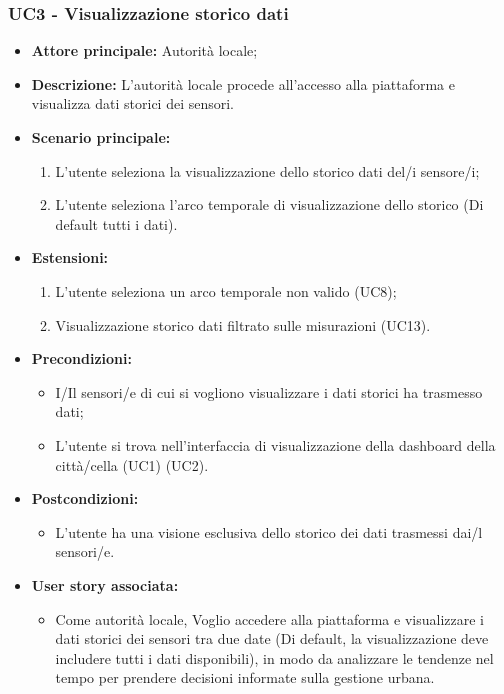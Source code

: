 \subsubsection{UC3 - Visualizzazione storico dati }

\begin{itemize}
    \item \textbf{Attore principale:} Autorità locale;
    \item \textbf{Descrizione:} L'autorità locale procede all'accesso alla piattaforma e visualizza dati storici dei sensori.
    \item \textbf{Scenario principale:}
          \begin{enumerate}
              \item L'utente seleziona la visualizzazione dello storico dati del/i sensore/i;
              \item L'utente seleziona l'arco temporale di visualizzazione dello storico (Di default tutti i dati).
          \end{enumerate}
    \item \textbf{Estensioni:}
          \begin{enumerate}
              \item L'utente seleziona un arco temporale non valido (UC8);
              \item Visualizzazione storico dati filtrato sulle misurazioni (UC13).
          \end{enumerate}
    \item \textbf{Precondizioni:}
          \begin{itemize}
              \item  I/Il sensori/e di cui si vogliono visualizzare i dati storici ha trasmesso dati;
              \item  L'utente si trova nell'interfaccia di visualizzazione della dashboard della città/cella  (UC1) (UC2).
          \end{itemize}
    \item \textbf{Postcondizioni:}
          \begin{itemize}
              \item  L'utente ha una visione esclusiva dello storico dei dati trasmessi  dai/l sensori/e.
          \end{itemize}
    \item \textbf{User story associata:}
          \begin{itemize}
              \item Come autorità locale,
                    Voglio accedere alla piattaforma e visualizzare i dati storici dei sensori tra due date (Di default, la
                    visualizzazione deve includere
                    tutti i dati disponibili),
                    in modo da analizzare le tendenze nel tempo per prendere decisioni informate sulla gestione urbana.
          \end{itemize}
\end{itemize}